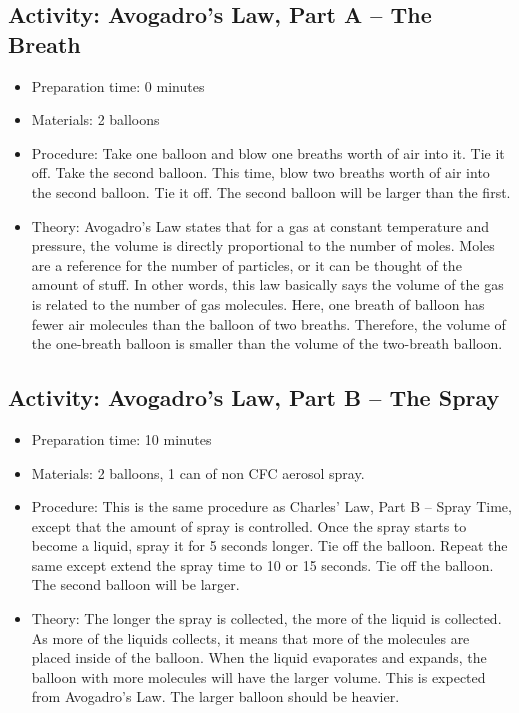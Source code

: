 \begin{itemize}
{\begin{itemize}
\begin{itemize}
{\subsection{Activity: Avogadro’s Law, Part A – The Breath}
\begin{itemize}
\item{Preparation time: 0 minutes}
\item{Materials: 2 balloons}
\item{Procedure: Take one balloon and blow one breaths worth of air into it. Tie it off. Take the second balloon. This time, blow two breaths worth of air into the second balloon. Tie it off. The second balloon will be larger than the first. }
\item{Theory: Avogadro’s Law states that for a gas at constant temperature and pressure, the volume is directly proportional to the number of moles. Moles are a reference for the number of particles, or it can be thought of the amount of stuff. In other words, this law basically says the volume of the gas is related to the number of gas molecules. Here, one breath of balloon has fewer air molecules than the balloon of two breaths. Therefore, the volume of the one-breath balloon is smaller than the volume of the two-breath balloon.}
\end{itemize}

\subsection{Activity: Avogadro’s Law, Part B – The Spray}
\begin{itemize}
\item{Preparation time: 10 minutes}
\item{Materials: 2 balloons, 1 can of non CFC aerosol spray.}
\item{Procedure: This is the same procedure as Charles’ Law, Part B – Spray Time, except that the amount of spray is controlled. Once the spray starts to become a liquid, spray it for 5 seconds longer. Tie off the balloon. Repeat the same except extend the spray time to 10 or 15 seconds. Tie off the balloon. The second balloon will be larger.}
\item{Theory: The longer the spray is collected, the more of the liquid is collected. As more of the liquids collects, it means that more of the molecules are placed inside of the balloon. When the liquid evaporates and expands, the balloon with more molecules will have the larger volume. This is expected from Avogadro’s Law. The larger balloon should be heavier.}
\end{itemize}

}
\end{itemize}
\end{itemize}}
\end{itemize}
